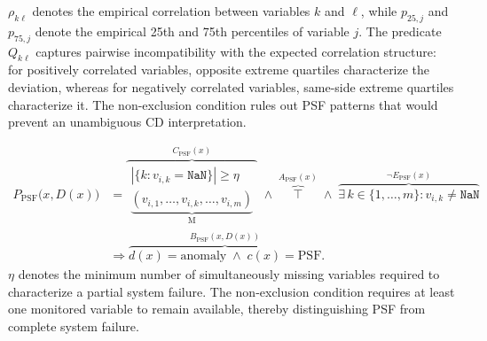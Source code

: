 \documentclass[preprint,12pt]{elsarticle}
\begin{document}
\(\rho_{k\ell}\) denotes the empirical correlation between variables
\(k\) and \(\ell\), while \(p_{25,j}\) and \(p_{75,j}\) denote the
empirical 25th and 75th percentiles of variable \(j\).
The predicate \(Q_{k\ell}\) captures pairwise incompatibility with the
expected correlation structure: for positively correlated variables,
opposite extreme quartiles characterize the deviation, whereas for
negatively correlated variables, same-side extreme quartiles characterize
it. The non-exclusion condition rules out PSF patterns that would prevent
an unambiguous CD interpretation.

\begingroup
\scriptsize
\begin{equation}
\begin{aligned}
P_{\mathrm{PSF}}\bigl(x,D(x)\bigr)
&=
\overbrace{
    \substack{
    \left|
    \{k:v_{i,k}=\texttt{NaN}\}
    \right|\geq\eta
    \\[1mm]
    \underbrace{
    (v_{i,1},\ldots,v_{i,k},\ldots,v_{i,m})
    }_{\mathrm{M}}
    }
}^{C_{\mathrm{PSF}}(x)}
\;\land\;
\overbrace{
    \top
}^{A_{\mathrm{PSF}}(x)}
\;\land\;
\overbrace{
    \exists\,k\in\{1,\ldots,m\}:
    v_{i,k}\neq\texttt{NaN}
}^{\neg E_{\mathrm{PSF}}(x)}
\\[1mm]
&\Rightarrow
\overbrace{
    d(x)=\mathrm{anomaly}
    \;\land\;
    c(x)=\mathrm{PSF}
}^{B_{\mathrm{PSF}}(x,D(x))}.
\end{aligned}
\label{eq:property_psf}
\end{equation}
\endgroup
\(\eta\) denotes the minimum number of simultaneously missing variables
required to characterize a partial system failure. The non-exclusion
condition requires at least one monitored variable to remain available,
thereby distinguishing PSF from complete system failure.
\end{document}
